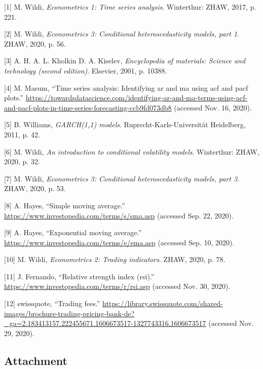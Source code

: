 \documentclass[
]{article}
\newenvironment{cslreferences}%
  {}%
  {\par}
\begin{document}
\hypertarget{refs}{}
\begin{cslreferences}
\leavevmode\hypertarget{ref-eco1}{}%
{[}1{]} M. Wildi, \emph{Econometrics 1: Time series analysis}.
Winterthur: ZHAW, 2017, p. 221.

\leavevmode\hypertarget{ref-slide_eco3_1}{}%
{[}2{]} M. Wildi, \emph{Econometrics 3: Conditional heteroscedasticity
models, part 1}. ZHAW, 2020, p. 56.

\leavevmode\hypertarget{ref-acf}{}%
{[}3{]} A. H. A. L. Kholkin D. A. Kiselev, \emph{Encyclopedia of
materials: Science and technology (second edition)}. Elsevier, 2001, p.
10388.

\leavevmode\hypertarget{ref-arima}{}%
{[}4{]} M. Masum, ``Time series analysis: Identifying ar and ma using
acf and pacf plots.''
\url{https://towardsdatascience.com/identifying-ar-and-ma-terms-using-acf-and-pacf-plots-in-time-series-forecasting-ccb9fd073db8}
(accessed Nov. 16, 2020).

\leavevmode\hypertarget{ref-garch11}{}%
{[}5{]} B. Williams, \emph{GARCH(1,1) models}.
Ruprecht-Karls-Universität Heidelberg, 2011, p. 42.

\leavevmode\hypertarget{ref-eco2}{}%
{[}6{]} M. Wildi, \emph{An introduction to conditional volatility
models}. Winterthur: ZHAW, 2020, p. 32.

\leavevmode\hypertarget{ref-slide_eco3_3}{}%
{[}7{]} M. Wildi, \emph{Econometrics 3: Conditional heteroscedasticity
models, part 3}. ZHAW, 2020, p. 53.

\leavevmode\hypertarget{ref-SMA}{}%
{[}8{]} A. Hayes, ``Simple moving average.''
\url{https://www.investopedia.com/terms/s/sma.asp} (accessed Sep. 22,
2020).

\leavevmode\hypertarget{ref-EMA}{}%
{[}9{]} A. Hayes, ``Exponential moving average.''
\url{https://www.investopedia.com/terms/e/ema.asp} (accessed Sep. 10,
2020).

\leavevmode\hypertarget{ref-slide_trading_indicators_univariate}{}%
{[}10{]} M. Wildi, \emph{Econometrics 2: Trading indicators}. ZHAW,
2020, p. 78.

\leavevmode\hypertarget{ref-RSI}{}%
{[}11{]} J. Fernando, ``Relative strength index (rsi).''
\url{https://www.investopedia.com/terms/r/rsi.asp} (accessed Nov. 30,
2020).

\leavevmode\hypertarget{ref-swissquote}{}%
{[}12{]} swissquote, ``Trading fees.''
\url{https://library.swissquote.com/shared-images/brochure-trading-pricing-bank-de?_ga=2.183413157.222455671.1606673517-1327743316.1606673517}
(accessed Nov. 29, 2020).
\end{cslreferences}

\newpage

\hypertarget{attachment}{%
\subsection{Attachment}\label{attachment}}
\end{document}
